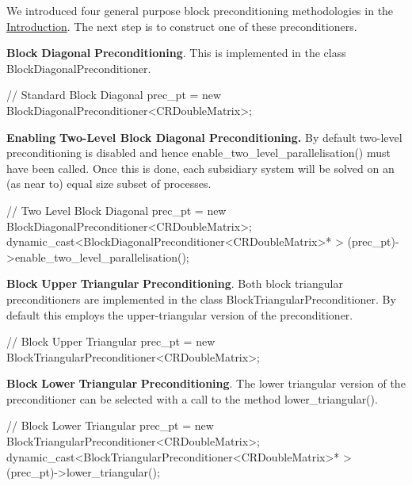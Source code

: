 We introduced four general purpose block preconditioning methodologies in the \hyperlink{index_introduction}{Introduction}. The next step is to construct one of these preconditioners.
\begin{DoxyItemize}
\item {\bfseries Block} {\bfseries Diagonal} {\bfseries Preconditioning}. This is implemented in the class {\ttfamily Block\+Diagonal\+Preconditioner}.  
\begin{DoxyCodeInclude}
   \textcolor{comment}{// Standard Block Diagonal}
   prec\_pt = \textcolor{keyword}{new} BlockDiagonalPreconditioner<CRDoubleMatrix>;

\end{DoxyCodeInclude}

\item {\bfseries Enabling} {\bfseries Two-\/{\bfseries Level} {\bfseries Block} {\bfseries Diagonal} {\bfseries Preconditioning}.} By default two-\/level preconditioning is disabled and hence {\ttfamily enable\+\_\+two\+\_\+level\+\_\+parallelisation()} must have been called. Once this is done, each subsidiary system will be solved on an (as near to) equal size subset of processes.  
\begin{DoxyCodeInclude}
   \textcolor{comment}{// Two Level Block Diagonal}
   prec\_pt = \textcolor{keyword}{new} BlockDiagonalPreconditioner<CRDoubleMatrix>;
   \textcolor{keyword}{dynamic\_cast<}BlockDiagonalPreconditioner<CRDoubleMatrix>* \textcolor{keyword}{>}
    (prec\_pt)->enable\_two\_level\_parallelisation();

\end{DoxyCodeInclude}

\item {\bfseries Block} {\bfseries Upper} {\bfseries Triangular} {\bfseries Preconditioning}. Both block triangular preconditioners are implemented in the class {\ttfamily Block\+Triangular\+Preconditioner}. By default this employs the upper-\/triangular version of the preconditioner.  
\begin{DoxyCodeInclude}
   \textcolor{comment}{// Block Upper Triangular}
   prec\_pt = \textcolor{keyword}{new} BlockTriangularPreconditioner<CRDoubleMatrix>;

\end{DoxyCodeInclude}

\item {\bfseries Block} {\bfseries Lower} {\bfseries Triangular} {\bfseries Preconditioning}. The lower triangular version of the preconditioner can be selected with a call to the method {\ttfamily lower\+\_\+triangular()}.  
\begin{DoxyCodeInclude}
   \textcolor{comment}{// Block Lower Triangular}
   prec\_pt = \textcolor{keyword}{new} BlockTriangularPreconditioner<CRDoubleMatrix>;
   \textcolor{keyword}{dynamic\_cast<}BlockTriangularPreconditioner<CRDoubleMatrix>* \textcolor{keyword}{>}
    (prec\_pt)->lower\_triangular();

\end{DoxyCodeInclude}

\end{DoxyItemize}

